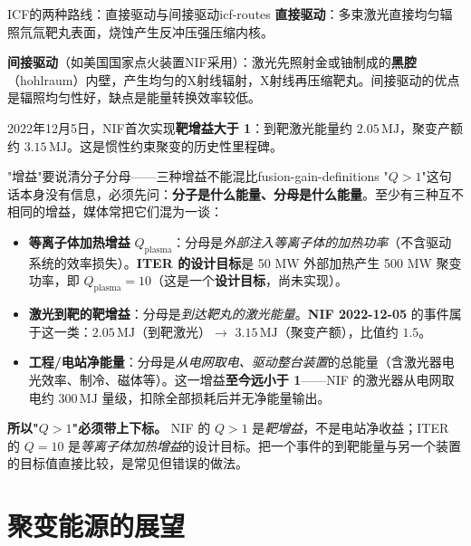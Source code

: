 \documentclass[12pt,a4paper,openany,oneside]{book}
\newcommand{\difficulty}[1]{\marginnote{\hfill\textcolor{coverMid!80}{\rule[-0.1em]{2pt}{0.9em}}\,\textcolor{coverMid}{\footnotesize\textbf{[#1]}}}}
\begin{document}
\begin{insight}{ICF的两种路线：直接驱动与间接驱动}{icf-routes}
\textbf{直接驱动}：多束激光直接均匀辐照氘氚靶丸表面，烧蚀产生反冲压强压缩内核。

\textbf{间接驱动}（如美国国家点火装置NIF采用）：激光先照射金或铀制成的\textbf{黑腔}（hohlraum）内壁，产生均匀的X射线辐射，X射线再压缩靶丸。间接驱动的优点是辐照均匀性好，缺点是能量转换效率较低。

2022年12月5日，NIF首次实现\textbf{靶增益大于 1}：到靶激光能量约 $2.05\,\mathrm{MJ}$，聚变产额约 $3.15\,\mathrm{MJ}$。这是惯性约束聚变的历史性里程碑。
\end{insight}

\begin{warning}{"增益"要说清分子分母——三种增益不能混比}{fusion-gain-definitions}
"$Q>1$"这句话本身没有信息，必须先问：\textbf{分子是什么能量、分母是什么能量}。至少有三种互不相同的增益，媒体常把它们混为一谈：
\begin{itemize}
\item \textbf{等离子体加热增益} $Q_{\text{plasma}}$：分母是\emph{外部注入等离子体的加热功率}（不含驱动系统的效率损失）。\textbf{ITER 的设计目标}是 50 MW 外部加热产生 500 MW 聚变功率，即 $Q_{\text{plasma}}=10$（这是一个\textbf{设计目标}，尚未实现）。
\item \textbf{激光到靶的靶增益}：分母是\emph{到达靶丸的激光能量}。\textbf{NIF 2022-12-05} 的事件属于这一类：$2.05\,\mathrm{MJ}$（到靶激光）$\to$ $3.15\,\mathrm{MJ}$（聚变产额），比值约 $1.5$。
\item \textbf{工程/电站净能量}：分母是\emph{从电网取电、驱动整台装置}的总能量（含激光器电光效率、制冷、磁体等）。这一增益\textbf{至今远小于 1}——NIF 的激光器从电网取电约 $300\,\mathrm{MJ}$ 量级，扣除全部损耗后并无净能量输出。
\end{itemize}
\textbf{所以"$Q>1$"必须带上下标。} NIF 的 $Q>1$ 是\emph{靶增益}，不是电站净收益；ITER 的 $Q=10$ 是\emph{等离子体加热增益}的设计目标。把一个事件的到靶能量与另一个装置的目标值直接比较，是常见但错误的做法。
\end{warning}

\section{聚变能源的展望}\difficulty{提高}
\end{document}
